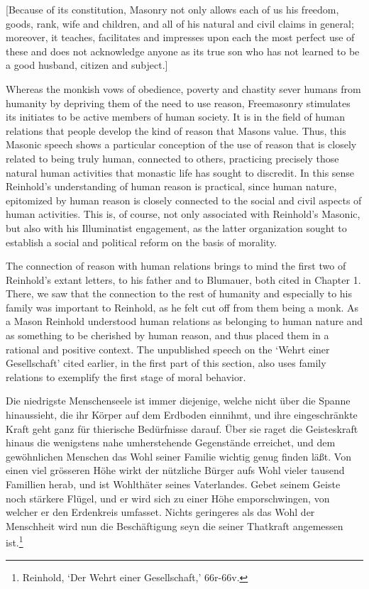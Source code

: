 [Because of its constitution, Masonry not only allows each of us his freedom, goods, rank, wife and children, and all of his natural and civil claims in general; moreover, it teaches, facilitates and impresses upon each the most perfect use of these and does not acknowledge anyone as its true son who has not learned to be a good husband, citizen and subject.]

Whereas the monkish vows of obedience, poverty and chastity sever humans from humanity by depriving them of the need to use reason, Freemasonry stimulates its initiates to be active members of human society. It is in the field of human relations that people develop the kind of reason that Masons value. Thus, this Masonic speech shows a particular conception of the use of reason that is closely related to being truly human, connected to others, practicing precisely those natural human activities that monastic life has sought to discredit. In this sense Reinhold's understanding of human reason is practical, since human nature, epitomized by human reason is closely connected to the social and civil aspects of human activities. This is, of course, not only associated with Reinhold's Masonic, but also with his Illuminatist engagement, as the latter organization sought to establish a social and political reform on the basis of morality. 

 The connection of reason with human relations brings to mind the first two of Reinhold's extant letters, to his father and to Blumauer, both cited in Chapter 1. There, we saw that the connection to the rest of humanity and especially to his family was important to Reinhold, as he felt cut off from them being a monk. As a Mason Reinhold understood human relations as belonging to human nature and as something to be cherished by human reason, and thus placed them in a rational and positive context. The unpublished speech on the `Wehrt einer Gesellschaft' cited earlier, in the first part of this section, also uses family relations to exemplify the first stage of moral behavior. 

Die niedrigste Menschenseele ist immer diejenige, welche nicht \"{u}ber die Spanne hinaussieht, die ihr K\"{o}rper auf dem Erdboden einnihmt, und ihre eingeschr\"{a}nkte Kraft geht ganz f\"{u}r thierische Bed\"{u}rfnisse darauf. \"{U}ber sie raget die Geisteskraft hinaus die wenigstens nahe umherstehende Gegenst\"{a}nde erreichet, und dem gew\"{o}hnlichen Menschen das Wohl seiner Familie wichtig genug finden l\"{a}\ss{}t. Von einen viel gr\"{o}sseren H\"{o}he wirkt der n\"{u}tzliche B\"{u}rger aufs Wohl vieler tausend Famillien herab, und ist Wohlth\"{a}ter seines Vaterlandes. Gebet seinem Geiste noch st\"{a}rkere Fl\"{u}gel, und er wird sich zu einer H\"{o}he emporschwingen, von welcher er den Erdenkreis umfasset. Nichts geringeres als das Wohl der Menschheit wird nun die Besch\"{a}ftigung seyn die seiner Thatkraft angemessen ist.\footnote{ Reinhold, `Der Wehrt einer Gesellschaft,' 66r{-}66v.}

